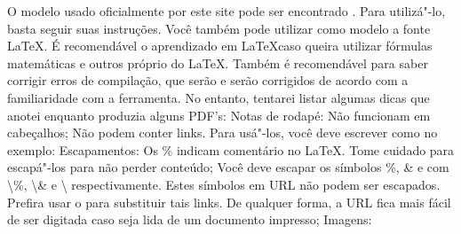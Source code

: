 {}O modelo usado oficialmente por este site pode ser encontrado . Para utilizá"-lo, basta seguir suas instruções. Você também pode utilizar como modelo a fonte \LaTeX {}.\fimsubsubsec\markdownRendererInterblockSeparator
{}\markdownRendererInterblockSeparator
{}É recomendável o aprendizado em \LaTeX caso queira utilizar fórmulas matemáticas e outros  próprio do \LaTeX. Também é recomendável para saber corrigir erros de compilação, que serão  e serão corrigidos de acordo com a familiaridade com a ferramenta. No entanto, tentarei listar algumas dicas que anotei enquanto produzia alguns PDF's:\markdownRendererInterblockSeparator
{}\markdownRendererUlBegin
\markdownRendererUlItem Notas de rodapé:\markdownRendererInterblockSeparator
{}\markdownRendererUlBeginTight
\markdownRendererUlItem Não funcionam em cabeçalhos;\markdownRendererUlItemEnd 
\markdownRendererUlItem Não podem conter links. Para usá"-los, você deve escrever como no exemplo:\markdownRendererUlItemEnd 
\markdownRendererUlEndTight \markdownRendererUlItemEnd 
\markdownRendererUlEnd \markdownRendererInterblockSeparator
{}\markdownRendererInterblockSeparator
{}\markdownRendererUlBegin
\markdownRendererUlItem Escapamentos:\markdownRendererInterblockSeparator
{}\markdownRendererUlBeginTight
\markdownRendererUlItem Os \%{} indicam comentário no \LaTeX. Tome cuidado para escapá"-los para não perder conteúdo;\markdownRendererUlItemEnd 
\markdownRendererUlItem Você deve escapar os símbolos \%{}, \&{} e \hash{} com \textbackslash \%{}, \textbackslash \&{} e \textbackslash \hash{} respectivamente.\markdownRendererInterblockSeparator
{}\markdownRendererUlBeginTight
\markdownRendererUlItem Estes símbolos em URL não podem ser escapados. Prefira usar o  para substituir tais links. De qualquer forma, a URL fica mais fácil de ser digitada caso seja lida de um documento impresso;\markdownRendererUlItemEnd 
\markdownRendererUlEndTight \markdownRendererUlItemEnd 
\markdownRendererUlEndTight \markdownRendererUlItemEnd 
\markdownRendererUlItem Imagens:\markdownRendererInterblockSeparator

